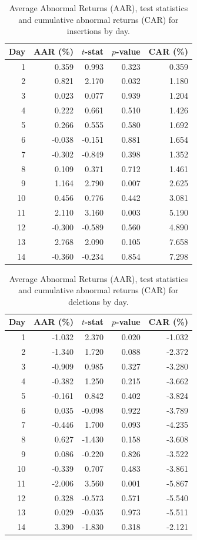 \documentclass{article}
\begin{document}
\begin{table}[htbp]
\centering
\caption{Average Abnormal Returns (AAR), test statistics and cumulative abnormal returns (CAR) for insertions by day.}
\label{tab:insertions_aar_car_daily}
\begin{tabular}{rrrrr}
\toprule
Day & AAR (\%) & $t$-stat & $p$-value & CAR (\%) \\
\midrule
1  & 0.359  & 0.993  & 0.323 & 0.359 \\
2  & 0.821  & 2.170  & 0.032 & 1.180 \\
3  & 0.023  & 0.077  & 0.939 & 1.204 \\
4  & 0.222  & 0.661  & 0.510 & 1.426 \\
5  & 0.266  & 0.555  & 0.580 & 1.692 \\
6  & -0.038 & -0.151 & 0.881 & 1.654 \\
7  & -0.302 & -0.849 & 0.398 & 1.352 \\
8  & 0.109  & 0.371  & 0.712 & 1.461 \\
9  & 1.164  & 2.790  & 0.007 & 2.625 \\
10 & 0.456  & 0.776  & 0.442 & 3.081 \\
11 & 2.110  & 3.160  & 0.003 & 5.190 \\
12 & -0.300 & -0.589 & 0.560 & 4.890 \\
13 & 2.768  & 2.090  & 0.105 & 7.658 \\
14 & -0.360 & -0.234 & 0.854 & 7.298 \\
\bottomrule
\end{tabular}
\end{table}

\begin{table}[htbp]
\centering
\caption{Average Abnormal Returns (AAR), test statistics and cumulative abnormal returns (CAR) for deletions by day.}
\label{tab:aar_car_deletions}
\begin{tabular}{rrrrr}
\toprule
Day & AAR (\%) & $t$-stat & $p$-value & CAR (\%) \\
\midrule
1  & -1.032 & 2.370 & 0.020 & -1.032 \\
2  & -1.340 & 1.720 & 0.088 & -2.372 \\
3  & -0.909 & 0.985 & 0.327 & -3.280 \\
4  & -0.382 & 1.250 & 0.215 & -3.662 \\
5  & -0.161 & 0.842 & 0.402 & -3.824 \\
6  & 0.035  & -0.098 & 0.922 & -3.789 \\
7  & -0.446 & 1.700 & 0.093 & -4.235 \\
8  & 0.627  & -1.430 & 0.158 & -3.608 \\
9  & 0.086  & -0.220 & 0.826 & -3.522 \\
10 & -0.339 & 0.707 & 0.483 & -3.861 \\
11 & -2.006 & 3.560 & 0.001 & -5.867 \\
12 & 0.328  & -0.573 & 0.571 & -5.540 \\
13 & 0.029  & -0.035 & 0.973 & -5.511 \\
14 & 3.390  & -1.830 & 0.318 & -2.121 \\
\bottomrule
\end{tabular}
\end{table}
\end{document}
